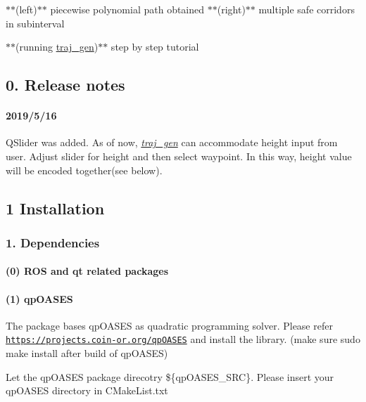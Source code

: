 

$\ast$$\ast$(left)$\ast$$\ast$ piecewise polynomial path obtained $\ast$$\ast$(right)$\ast$$\ast$ multiple safe corridors in subinterval




\begin{DoxyItemize}
\item $\ast$$\ast$(running \hyperlink{namespacetraj__gen}{traj\+\_\+gen})$\ast$$\ast$ step by step tutorial
\end{DoxyItemize}

\subsection*{0. Release notes}

\paragraph*{2019/5/16}

Q\+Slider was added. As of now, {\itshape \hyperlink{namespacetraj__gen}{traj\+\_\+gen}} can accommodate height input from user. Adjust slider for height and then select waypoint. In this way, height value will be encoded together(see below).



\subsection*{1 Installation}

\subsubsection*{1. Dependencies}

\paragraph*{(0) R\+OS and qt related packages}

\paragraph*{(1) qp\+O\+A\+S\+ES}


\begin{DoxyItemize}
\item The package bases qp\+O\+A\+S\+ES as quadratic programming solver. Please refer \href{https://projects.coin-or.org/qpOASES}{\tt https\+://projects.\+coin-\/or.\+org/qp\+O\+A\+S\+ES} and install the library. (make sure {\ttfamily sudo make install} after build of qp\+O\+A\+S\+ES)
\item Let the qp\+O\+A\+S\+ES package direcotry \$\{qp\+O\+A\+S\+E\+S\+\_\+\+S\+RC\}. Please insert your qp\+O\+A\+S\+ES directory in C\+Make\+List.\+txt
\end{DoxyItemize}


